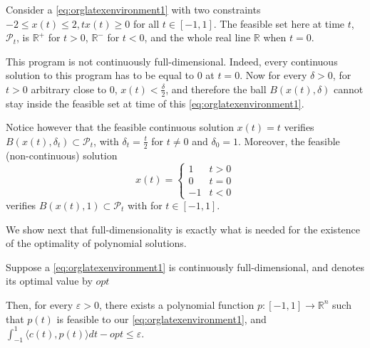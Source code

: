 \documentclass[moor]{informs1}
\begin{document}
\begin{myexample}
Consider a \ref{eq:orglatexenvironment1} with two constraints \(-2 \le x(t) \le 2, tx(t) \ge 0\) for all \(t \in [-1, 1]\). The feasible set here at time \(t\), \(\mathcal P_t\), is \(\mathbb R^+\) for \(t > 0\), \(\mathbb R^-\) for \(t < 0\), and the whole real line \(\mathbb R\) when \(t=0\).

This program is not continuously full-dimensional. Indeed, every continuous solution to this program has to be equal to 0 at \(t=0\). Now for every \(\delta > 0\), for \(t>0\) arbitrary close to \(0\), \(x(t) < \frac{\delta}2\), and therefore the ball \(B(x(t), \delta)\) cannot stay inside the feasible set at time of this \ref{eq:orglatexenvironment1}.

Notice however that the feasible continuous solution \(x(t) = t\) verifies \(B(x(t), \delta_t) \subset \mathcal P_t\), with \(\delta_t = \frac t2\) for \(t \ne 0\) and \(\delta_0 = 1\). Moreover, the feasible (non-continuous) solution
\[x(t) = \left\{\begin{array}{cc}1 & t > 0\\0&t=0\\-1&t<0\end{array}\right.\]
verifies \(B(x(t), 1) \subset \mathcal P_t\) with  for \(t \in [-1, 1]\).
\end{myexample}

We show next that full-dimensionality is exactly what is needed for the existence of the optimality of polynomial solutions.

\begin{thm}
Suppose a \ref{eq:orglatexenvironment1} is continuously full-dimensional, and denotes its optimal value by \(opt\)

Then, for every \(\varepsilon > 0\), there exists a polynomial function \(p: [-1, 1] \rightarrow \mathbb R^n\) such that  \(p(t)\) is feasible to our \ref{eq:orglatexenvironment1}, and \(\int_{-1}^1 \langle c(t), p(t)\rangle dt - opt \le \varepsilon\).
\label{orgspecialblock16}

\end{thm}
\end{document}
